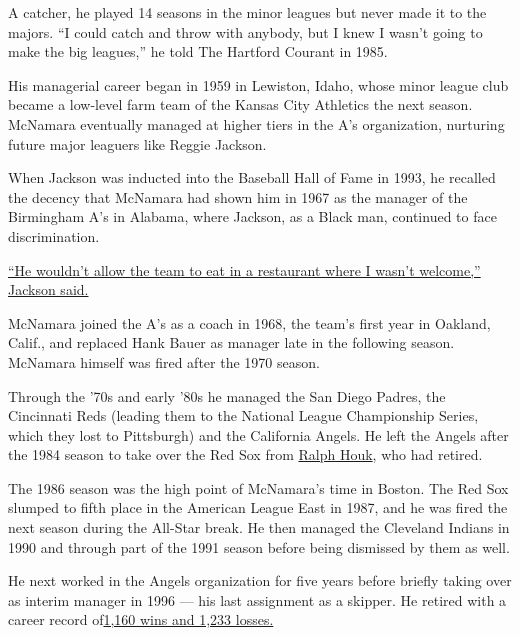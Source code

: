 A catcher, he played 14 seasons in the minor leagues but never made it
to the majors. ``I could catch and throw with anybody, but I knew I
wasn't going to make the big leagues,'' he told The Hartford Courant in
1985.

His managerial career began in 1959 in Lewiston, Idaho, whose minor
league club became a low-level farm team of the Kansas City Athletics
the next season. McNamara eventually managed at higher tiers in the A's
organization, nurturing future major leaguers like Reggie Jackson.

When Jackson was inducted into the Baseball Hall of Fame in 1993, he
recalled the decency that McNamara had shown him in 1967 as the manager
of the Birmingham A's in Alabama, where Jackson, as a Black man,
continued to face discrimination.

\href{https://www.baltimoresun.com/news/bs-xpm-1993-08-02-1993214108-story.html}{``He
wouldn't allow the team to eat in a restaurant where I wasn't welcome,''
Jackson said.}

McNamara joined the A's as a coach in 1968, the team's first year in
Oakland, Calif., and replaced Hank Bauer as manager late in the
following season. McNamara himself was fired after the 1970 season.

Through the '70s and early '80s he managed the San Diego Padres, the
Cincinnati Reds (leading them to the National League Championship
Series, which they lost to Pittsburgh) and the California Angels. He
left the Angels after the 1984 season to take over the Red Sox from
\href{https://www.nytimes.com/2010/07/22/sports/baseball/22Houk.html\#:~:text=Ralph\%20Houk\%2C\%20Yankees\%20Manager\%2C\%20Dies\%20at\%2090,-By\%20Richard\%20Goldstein\&text=Ralph\%20Houk\%2C\%20a\%20third\%2Dstring,He\%20was\%2090.\&text=\%E2\%80\%9CI'm\%20Ralph\%20Houk.\%E2\%80\%9D}{Ralph
Houk}, who had retired.

The 1986 season was the high point of McNamara's time in Boston. The Red
Sox slumped to fifth place in the American League East in 1987, and he
was fired the next season during the All-Star break. He then managed the
Cleveland Indians in 1990 and through part of the 1991 season before
being dismissed by them as well.

He next worked in the Angels organization for five years before briefly
taking over as interim manager in 1996 --- his last assignment as a
skipper. He retired with a career record
of\href{https://www.baseball-reference.com/managers/mcnamjo99.shtml}{1,160
wins and 1,233 losses.}

